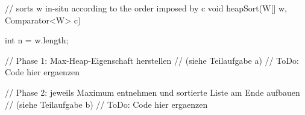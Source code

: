\documentclass{bschlangaul-aufgabe}
\begin{document}
\begin{enumerate}
\begin{bJavaAngabe}
// sorts w in-situ according to the order imposed by c
void heapSort(W[] w, Comparator<W> c) {
  int n = w.length;

  // Phase 1: Max-Heap-Eigenschaft herstellen
  // (siehe Teilaufgabe a)
  // ToDo: Code hier ergaenzen

  // Phase 2: jeweils Maximum entnehmen und sortierte Liste am Ende aufbauen
  // (siehe Teilaufgabe b)
  // ToDo: Code hier ergaenzen
}
\end{bJavaAngabe}

\begin{bAdditum}
\end{bAdditum}

\end{enumerate}
\end{document}
